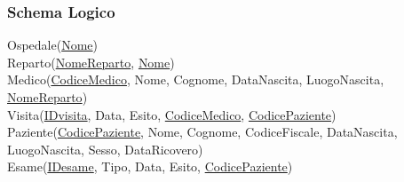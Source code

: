 \documentclass{article}
\begin{document}
	\subsubsection{Schema Logico}
	Ospedale(\underline{Nome})\\
	Reparto(\underline{NomeReparto}, \underline{Nome})\\
	Medico(\underline{CodiceMedico}, Nome, Cognome, DataNascita, LuogoNascita, \underline{NomeReparto})\\
	Visita(\underline{IDvisita}, Data, Esito, \underline{CodiceMedico}, \underline{CodicePaziente})\\
	Paziente(\underline{CodicePaziente}, Nome, Cognome, CodiceFiscale, DataNascita, LuogoNascita, Sesso, DataRicovero)\\
	Esame(\underline{IDesame}, Tipo, Data, Esito, \underline{CodicePaziente})
\end{document}
